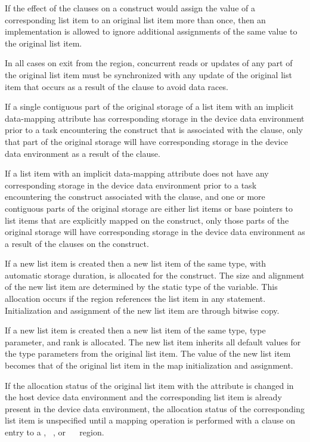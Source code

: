 \begin{note}
If the effect of the  clauses on a construct would assign the
value of a corresponding list item to an original list item more than once,
then an implementation is allowed to ignore additional assignments of
the same value to the original list item.
\end{note}

In all cases on exit from the region, concurrent reads or updates of any part of 
the original list item must be synchronized with any update of the original list 
item that occurs as a result of the  clause to avoid data races.

If a single contiguous part of the original storage of a list item with an
implicit data-mapping attribute has corresponding storage in the device data
environment prior to a task encountering the construct that is associated with the
 clause, only that part of the original storage will have corresponding 
storage in the device data environment as a result of the  clause.

If a list item with an implicit data-mapping attribute does not have
any corresponding storage in the device data environment prior to a
task encountering the construct associated with the  clause,
and one or more contiguous parts of the original storage are either
list items or base pointers to list items that are explicitly mapped
on the construct, only those parts of the original storage will have
corresponding storage in the device data environment as a result of
the  clauses on the construct.

\begin{ccppspecific}
If a new list item is created then a new list item of the same type, with 
automatic storage duration, is allocated for the construct. The size and alignment 
of the new list item are determined by the static type of the variable. This 
allocation occurs if the region references the list item in any statement.
Initialization and assignment of the new list item are through bitwise copy.
\end{ccppspecific}

\begin{fortranspecific}
If a new list item is created then a new list item of the same type, type 
parameter, and rank is allocated.  The new list item inherits all default 
values for the type parameters from the original list item.
The value of the new list item becomes that of the original list item
in the map initialization and assignment.

If the allocation status of the original list item with the
 attribute is changed in the host device data
environment and the corresponding list item is already present in the
device data environment, the allocation status of the corresponding
list item is unspecified until a mapping operation is performed with a
 clause on entry to a , ~, or
~~ region.
\end{fortranspecific}

